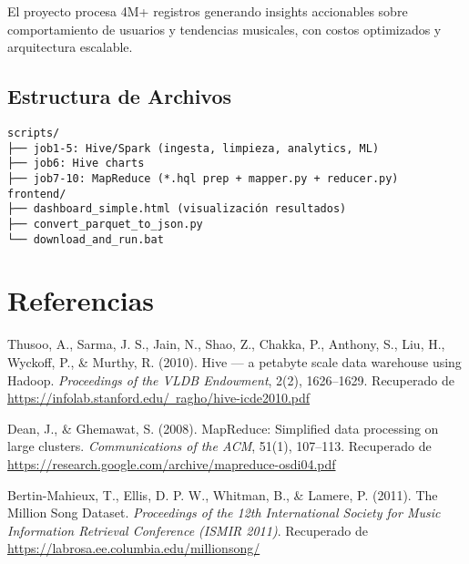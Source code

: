 \documentclass[11pt,a4paper]{article}
\begin{document}
El proyecto procesa 4M+ registros generando insights accionables sobre comportamiento de usuarios y tendencias musicales, con costos optimizados y arquitectura escalable.

\subsection{Estructura de Archivos}
\begin{verbatim}
scripts/
├── job1-5: Hive/Spark (ingesta, limpieza, analytics, ML)
├── job6: Hive charts
├── job7-10: MapReduce (*.hql prep + mapper.py + reducer.py)
frontend/
├── dashboard_simple.html (visualización resultados)
├── convert_parquet_to_json.py
└── download_and_run.bat
\end{verbatim}



\section{Referencias}

\begin{thebibliography}{9}

Thusoo, A., Sarma, J. S., Jain, N., Shao, Z., Chakka, P., Anthony, S., Liu, H., Wyckoff, P., \& Murthy, R. (2010). 
Hive — a petabyte scale data warehouse using Hadoop. 
\textit{Proceedings of the VLDB Endowment}, 2(2), 1626–1629. 
Recuperado de \href{https://infolab.stanford.edu/~ragho/hive-icde2010.pdf}{https://infolab.stanford.edu/~ragho/hive-icde2010.pdf}

Dean, J., \& Ghemawat, S. (2008). 
MapReduce: Simplified data processing on large clusters. 
\textit{Communications of the ACM}, 51(1), 107–113. 
Recuperado de \href{https://research.google.com/archive/mapreduce-osdi04.pdf}{https://research.google.com/archive/mapreduce-osdi04.pdf}

Bertin-Mahieux, T., Ellis, D. P. W., Whitman, B., \& Lamere, P. (2011). 
The Million Song Dataset. 
\textit{Proceedings of the 12th International Society for Music Information Retrieval Conference (ISMIR 2011)}. 
Recuperado de \href{https://labrosa.ee.columbia.edu/millionsong/}{https://labrosa.ee.columbia.edu/millionsong/}

\end{thebibliography}
\end{document}
